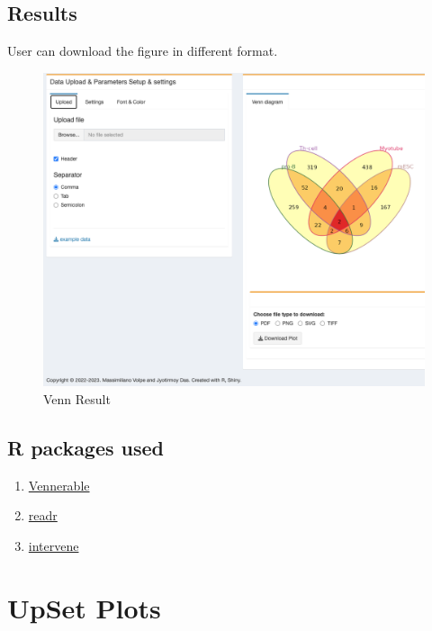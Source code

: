 \documentclass[
  a4paper,
  oneside,
  open=any]{scrreport}
\providecommand{\tightlist}{%
  \setlength{\itemsep}{0pt}\setlength{\parskip}{0pt}}\usepackage{longtable,booktabs,array}
\begin{document}
\hypertarget{results}{%
\section{Results}\label{results}}

User can download the figure in different format.

\begin{figure}[H]

{\centering \includegraphics{./_images/Venndiag.png}

}

\caption{Venn Result}

\end{figure}

\hypertarget{r-packages-used-6}{%
\section{R packages used}\label{r-packages-used-6}}

\begin{enumerate}
\def\labelenumi{\arabic{enumi}.}
\tightlist
\item
  \href{https://github.com/js229/Vennerable}{Vennerable}
\item
  \href{https://cran.r-project.org/web/packages/readr/readr.pdf}{readr}
\item
  \href{https://github.com/asntech/intervene}{intervene}
\end{enumerate}

\hypertarget{sec-upset}{%
\chapter{UpSet Plots}\label{sec-upset}}
\end{document}
